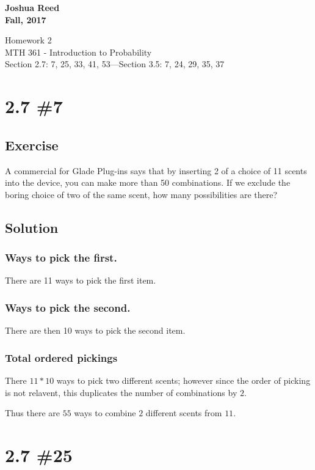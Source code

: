 \documentclass[12pt]{article}
\begin{document}
{%
  \large \bfseries 
  Joshua Reed \\
  Fall, 2017 \\
  \begin{center}
    {\huge Homework 2}\\
    MTH 361 - Introduction to Probability \\%
  Section 2.7: 7, 25, 33, 41, 53---Section 3.5: 7, 24, 29, 35, 37
  \end{center}}
 
 
\section{2.7 \#7} 
\subsection{Exercise}A commercial for Glade Plug-ins says that by inserting 2 of a choice of 11 scents into the device, you can make more than 50 combinations. If we exclude 
the boring choice of two of the same scent, how many possibilities are there?

\subsection{Solution}
\subsubsection{Ways to pick the first.}
There are 11 ways to pick the first item. 

\subsubsection{Ways to pick the second.}
There are then 10 ways to pick the second item. 

\subsubsection{Total ordered pickings}
There $11*10$ ways to pick two different scents; however since the order of picking is not relavent, this duplicates the number of combinations by $2$. 

Thus there are \textbf{$55$} ways to combine $2$ different scents from $11$.

\section{2.7 \#25} 
\end{document}
